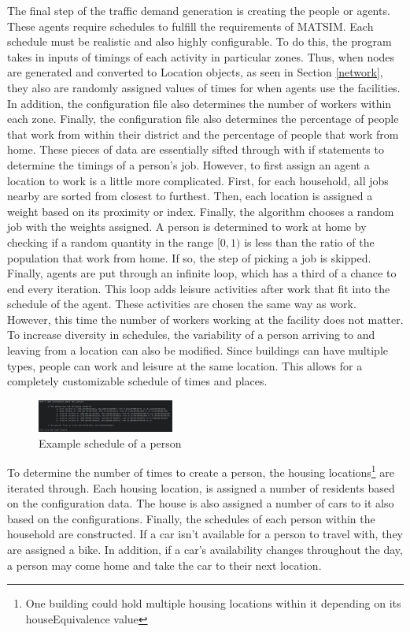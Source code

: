 \documentclass[11pt]{article}
\begin{document}
\begin{multicols}{2}
    \quad The final step of the traffic demand generation is creating the people or agents. These agents require schedules to fulfill the requirements of MATSIM\cite{matsim}. Each schedule must be realistic and also highly configurable. To do this, the program takes in inputs of timings of each activity in particular zones. Thus, when nodes are generated and converted to Location objects, as seen in Section \ref{network}, they also are randomly assigned values of times for when agents use the facilities. In addition, the configuration file also determines the number of workers within each zone. Finally, the configuration file also determines the percentage of people that work from within their district and the percentage of people that work from home. These pieces of data are essentially sifted through with if statements to determine the timings of a person's job. However, to first assign an agent a location to work is a little more complicated. First, for each household, all jobs nearby are sorted from closest to furthest. Then, each location is assigned a weight based on its proximity or index. Finally, the algorithm chooses a random job with the weights assigned. A person is determined to work at home by checking if a random quantity in the range \([0, 1)\) is less than the ratio of the population that work from home. If so, the step of picking a job is skipped. Finally, agents are put through an infinite loop, which has a third of a chance to end every iteration. This loop adds leisure activities after work that fit into the schedule of the agent. These activities are chosen the same way as work. However, this time the number of workers working at the facility does not matter. To increase diversity in schedules, the variability of a person arriving to and leaving from a location can also be modified. Since buildings can have multiple types, people can work and leisure at the same location. This allows for a completely customizable schedule of times and places.

    \begin{figure}[H]
        \centering
        \includegraphics[width=0.4\textwidth]{images/examplepopulation.png}
        \caption{Example schedule of a person}
        \label{fig:example-schedule}
    \end{figure}

    \quad To determine the number of times to create a person, the housing locations\footnote{One building could hold multiple housing locations within it depending on its houseEquivalence value} are iterated through. Each housing location, is assigned a number of residents based on the configuration data. The house is also assigned a number of cars to it also based on the configurations. Finally, the schedules of each person within the household are constructed. If a car isn't available for a person to travel with, they are assigned a bike. In addition, if a car's availability changes throughout the day, a person may come home and take the car to their next location. \\
    

\end{multicols}
\end{document}
